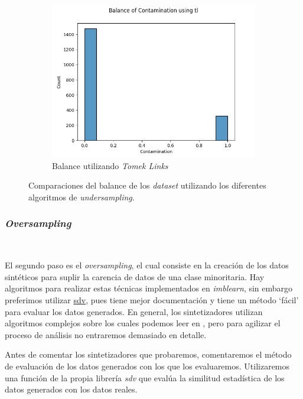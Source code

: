 \begin{figure}[!ht]
\begin{subfigure}[b]{0.3\textwidth}
        \includegraphics[width=\textwidth]{media/images/under-sampling/tl.png}
        \caption{Balance utilizando \textit{Tomek Links}}
    \end{subfigure}
    \caption{Comparaciones del balance de los \textit{dataset} utilizando los diferentes algoritmos de \textit{undersampling}.}\label{fig:undersampling-methods-balance}
\end{figure}
\clearpage

\subsubsection{\textit{Oversampling}}\ \label{sec:oversampling}

El segundo paso es el \textit{oversampling}, el cual consiste en la creación de los datos sintéticos para suplir la carencia de datos de una clase minoritaria. Hay algoritmos para realizar estas técnicas implementados en \textit{imblearn}, sin embargo preferimos utilizar \href{https://sdv.dev/}{sdv}, pues tiene mejor documentación y tiene un método `fácil' para evaluar los datos generados. \cite{Synthesi69:online} En general, los sintetizadores utilizan algoritmos complejos sobre los cuales podemos leer en \cite{Synthesi69:online}, pero para agilizar el proceso de análisis no entraremos demasiado en detalle.

Antes de comentar los sintetizadores que probaremos, comentaremos el método de evaluación de los datos generados con los que los evaluaremos. Utilizaremos una función de la propia librería \textit{sdv} que evalúa la similitud estadística de los datos generados con los datos reales.

